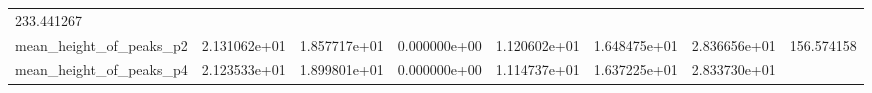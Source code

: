 \documentclass[11pt]{article}
\begin{document}
\begin{longtable}[]{@{}llllllll@{}}
\begin{minipage}[t]{0.08\columnwidth}
233.441267\strut
\end{minipage}\tabularnewline
\begin{minipage}[t]{0.16\columnwidth}\raggedright
mean\_height\_of\_peaks\_p2\strut
\end{minipage} & \begin{minipage}[t]{0.09\columnwidth}\raggedright
2.131062e+01\strut
\end{minipage} & \begin{minipage}[t]{0.09\columnwidth}\raggedright
1.857717e+01\strut
\end{minipage} & \begin{minipage}[t]{0.09\columnwidth}\raggedright
0.000000e+00\strut
\end{minipage} & \begin{minipage}[t]{0.09\columnwidth}\raggedright
1.120602e+01\strut
\end{minipage} & \begin{minipage}[t]{0.09\columnwidth}\raggedright
1.648475e+01\strut
\end{minipage} & \begin{minipage}[t]{0.09\columnwidth}\raggedright
2.836656e+01\strut
\end{minipage} & \begin{minipage}[t]{0.08\columnwidth}\raggedright
156.574158\strut
\end{minipage}\tabularnewline
\begin{minipage}[t]{0.16\columnwidth}\raggedright
mean\_height\_of\_peaks\_p4\strut
\end{minipage} & \begin{minipage}[t]{0.09\columnwidth}\raggedright
2.123533e+01\strut
\end{minipage} & \begin{minipage}[t]{0.09\columnwidth}\raggedright
1.899801e+01\strut
\end{minipage} & \begin{minipage}[t]{0.09\columnwidth}\raggedright
0.000000e+00\strut
\end{minipage} & \begin{minipage}[t]{0.09\columnwidth}\raggedright
1.114737e+01\strut
\end{minipage} & \begin{minipage}[t]{0.09\columnwidth}\raggedright
1.637225e+01\strut
\end{minipage} & \begin{minipage}[t]{0.09\columnwidth}\raggedright
2.833730e+01\strut
\end{minipage} & \begin{minipage}[t]{0.08\columnwidth}\raggedright

\end{minipage}
\end{longtable}
\end{document}

